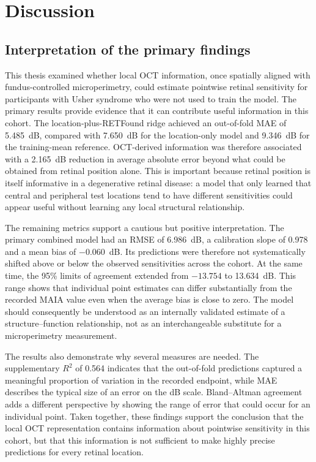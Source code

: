 \chapter{Discussion}
\label{chap:discussion}

\section{Interpretation of the primary findings}

This thesis examined whether local OCT information, once spatially aligned with fundus-controlled microperimetry, could estimate pointwise retinal sensitivity for participants with Usher syndrome who were not used to train the model. The primary results provide evidence that it can contribute useful information in this cohort. The location-plus-RETFound ridge achieved an out-of-fold MAE of 5.485~dB, compared with 7.650~dB for the location-only model and 9.346~dB for the training-mean reference. OCT-derived information was therefore associated with a 2.165~dB reduction in average absolute error beyond what could be obtained from retinal position alone. This is important because retinal position is itself informative in a degenerative retinal disease: a model that only learned that central and peripheral test locations tend to have different sensitivities could appear useful without learning any local structural relationship.

The remaining metrics support a cautious but positive interpretation. The primary combined model had an RMSE of 6.986~dB, a calibration slope of 0.978 and a mean bias of $-0.060$~dB. Its predictions were therefore not systematically shifted above or below the observed sensitivities across the cohort. At the same time, the 95\% limits of agreement extended from $-13.754$ to 13.634~dB. This range shows that individual point estimates can differ substantially from the recorded MAIA value even when the average bias is close to zero. The model should consequently be understood as an internally validated estimate of a structure--function relationship, not as an interchangeable substitute for a microperimetry measurement.

The results also demonstrate why several measures are needed. The supplementary $R^2$ of 0.564 indicates that the out-of-fold predictions captured a meaningful proportion of variation in the recorded endpoint, while MAE describes the typical size of an error on the dB scale. Bland--Altman agreement adds a different perspective by showing the range of error that could occur for an individual point. Taken together, these findings support the conclusion that the local OCT representation contains information about pointwise sensitivity in this cohort, but that this information is not sufficient to make highly precise predictions for every retinal location.

